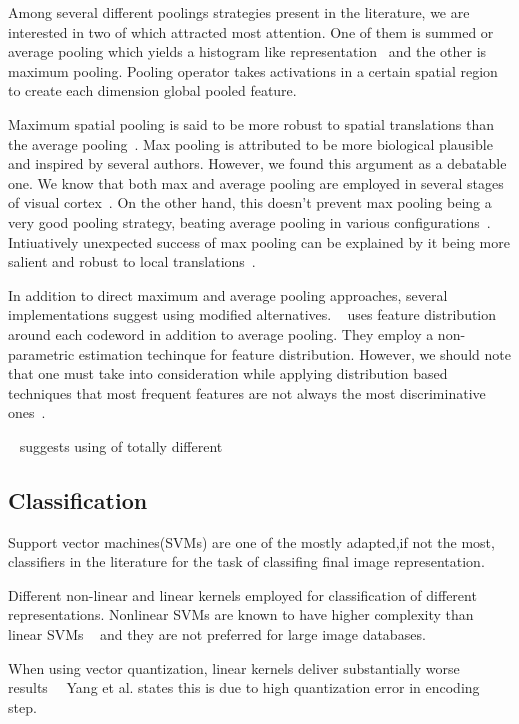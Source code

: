 \documentclass[conference]{IEEEtran}
\begin{document}
Among several different poolings strategies present in the literature, we are interested in two of which attracted most attention. One of them is summed or average pooling which yields a histogram like representation~\cite{5539963} and the other is maximum pooling. Pooling operator takes activations in a certain spatial region to create each dimension global pooled feature\cite{6248076}.

Maximum spatial pooling is said to be more robust to spatial translations than the average pooling~\cite{5206757}. Max pooling is attributed to be more biological plausible and inspired by several authors. However, we found this argument as a debatable one. We know that both max and average pooling are employed in several stages of visual cortex~\cite{6909713}. On the other hand, this doesn't prevent max pooling being a very good pooling strategy, beating average pooling in various configurations~\cite{5539963}. Intiuatively unexpected success of max pooling can be explained by it being more salient and robust to local translations~\cite{5539963}.

In addition to direct maximum and average pooling approaches, several implementations suggest using modified alternatives. ~\cite{Avila2013453} uses feature distribution around each codeword in addition to average pooling. They employ a non-parametric estimation techinque for feature distribution. However, we should note that one must take into consideration while applying distribution based techniques that most frequent features are not always the most discriminative ones~\cite{5128909}.


~\cite{McCannL12} suggests using of totally different 

\subsection {Classification}

Support vector machines(SVMs) are one of the mostly adapted,if not the most, classifiers in the literature for the task of classifing final image representation. 

Different non-linear and linear kernels employed for classification of different representations. Nonlinear SVMs are known to have higher complexity than linear SVMs ~\cite{5206757} and they are not preferred for large image databases.

When using vector quantization, linear kernels deliver substantially worse results~\cite{1641019}~\cite{5539963} Yang et al. states this is due to high quantization error in encoding step.
\end{document}

